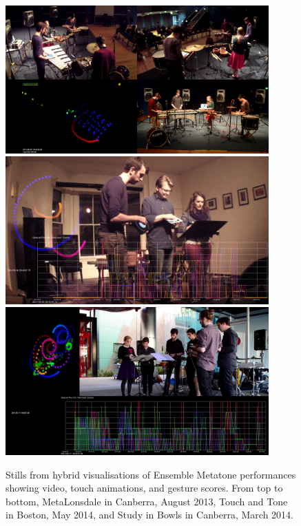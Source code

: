 \documentclass[graybox]{svmult}
\begin{document}
\begin{figure}
  \centering
  \includegraphics[width=0.9\textwidth]{figures/metatone-visualisation-metalonsdale}
  \includegraphics[width=0.9\textwidth]{figures/metatone-visualisation-touchandtone}
  \includegraphics[width=0.9\textwidth]{figures/metatone-visualisation-youarehere}
   \caption{Stills from hybrid visualisations of Ensemble Metatone
     performances showing video, touch animations, and gesture scores.
   From top to bottom, MetaLonsdale in Canberra, August 2013, Touch
   and Tone in Boston, May 2014, and Study in Bowls in Canberra, March 2014.}
  \label{metatoneanimation3}
\end{figure}
\end{document}
